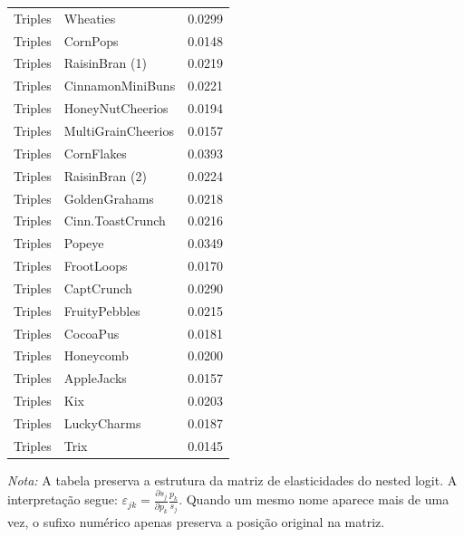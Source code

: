 \begin{table}[H]
\begin{tabular}{llr}
Triples & Wheaties & 0.0299 \\
Triples & CornPops & 0.0148 \\
Triples & RaisinBran (1) & 0.0219 \\
Triples & CinnamonMiniBuns & 0.0221 \\
Triples & HoneyNutCheerios & 0.0194 \\
Triples & MultiGrainCheerios & 0.0157 \\
Triples & CornFlakes & 0.0393 \\
Triples & RaisinBran (2) & 0.0224 \\
Triples & GoldenGrahams & 0.0218 \\
Triples & Cinn.ToastCrunch & 0.0216 \\
Triples & Popeye & 0.0349 \\
Triples & FrootLoops & 0.0170 \\
Triples & CaptCrunch & 0.0290 \\
Triples & FruityPebbles & 0.0215 \\
Triples & CocoaPus & 0.0181 \\
Triples & Honeycomb & 0.0200 \\
Triples & AppleJacks & 0.0157 \\
Triples & Kix & 0.0203 \\
Triples & LuckyCharms & 0.0187 \\
Triples & Trix & 0.0145 \\
\bottomrule
\end{tabular}

\vspace{0.3em}
\footnotesize
\textit{Nota:} A tabela preserva a estrutura da matriz de elasticidades do nested logit. A interpretação segue: $\varepsilon_{jk}=\frac{\partial s_j}{\partial p_k}\frac{p_k}{s_j}$. Quando um mesmo nome aparece mais de uma vez, o sufixo numérico apenas preserva a posição original na matriz.
\end{table}
\endgroup


